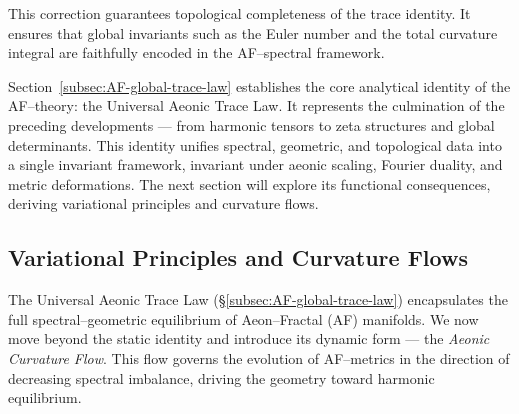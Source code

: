 \begin{remark}
This correction guarantees topological completeness of the trace identity.
It ensures that global invariants such as the Euler number
and the total curvature integral
are faithfully encoded in the AF–spectral framework.
\end{remark}


\begin{remark}
Section~\ref{subsec:AF-global-trace-law}
establishes the core analytical identity of the AF–theory:
the Universal Aeonic Trace Law.
It represents the culmination of the preceding developments —
from harmonic tensors to zeta structures and global determinants.
This identity unifies spectral, geometric, and topological data
into a single invariant framework, invariant under aeonic scaling,
Fourier duality, and metric deformations.
The next section will explore its functional consequences,
deriving variational principles and curvature flows.
\end{remark}


\subsection{Variational Principles and Curvature Flows}
\label{subsec:AF-variational-curvature}
\relax \hspace{0pt}


The Universal Aeonic Trace Law (\S\ref{subsec:AF-global-trace-law}) 
encapsulates the full spectral–geometric equilibrium of Aeon–Fractal (AF) manifolds.  
We now move beyond the static identity and introduce its dynamic form — 
the \emph{Aeonic Curvature Flow}.  
This flow governs the evolution of AF–metrics in the direction of decreasing 
spectral imbalance, driving the geometry toward harmonic equilibrium.  

